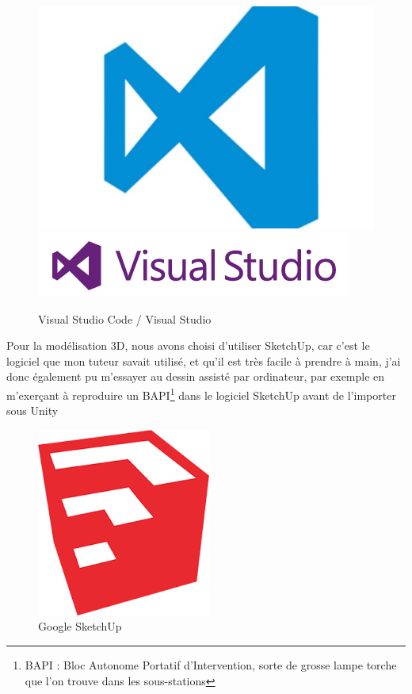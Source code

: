 \documentclass[a4paper]{article}
\begin{document}
    \begin{figure}[H]
        \centering
        \includegraphics[scale=0.05]{img/Logo-VSCode}
        \hspace{10pt}
        \includegraphics[scale=0.5]{img/logo-visual-studio}
        \caption{Visual Studio Code / Visual Studio}
    \end{figure}

    \vfill
    \newpage

    \vfill
    Pour la modélisation 3D, nous avons choisi d'utiliser SketchUp, car c'est le logiciel que mon tuteur savait utilisé, et qu'il est très facile à prendre à main, j'ai donc également pu m'essayer au dessin assisté par ordinateur, par exemple en m'exerçant à reproduire un BAPI\footnote{BAPI : Bloc Autonome Portatif d'Intervention, sorte de grosse lampe torche que l'on trouve dans les sous-stations} dans le logiciel SketchUp avant de l'importer sous Unity \\

    \vspace{20pt}
    
    \begin{figure}[H]
        \centering
        \includegraphics[scale=0.5]{img/Logo-skp}
        \caption{Google SketchUp}
    \end{figure}
\end{document}
